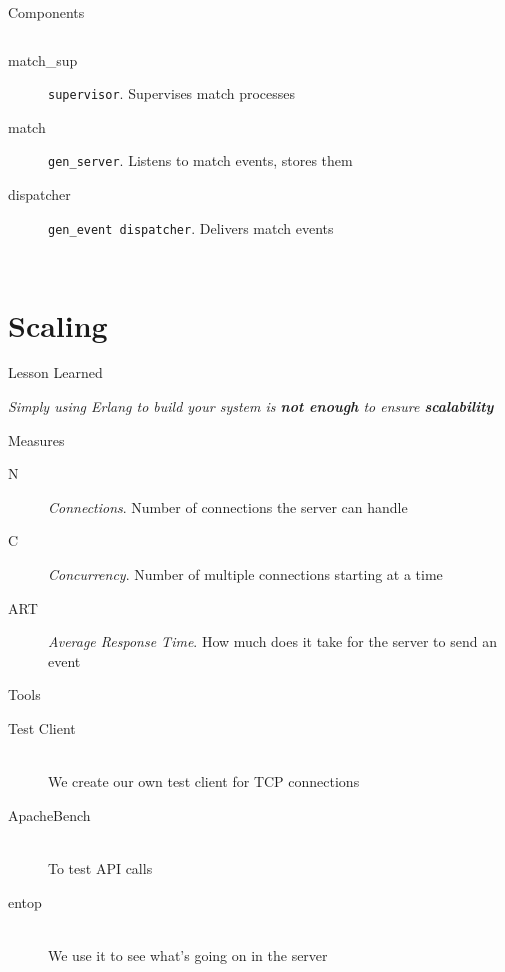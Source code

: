 \documentclass[utf8]{beamer}
\begin{document}
\begin{frame}{Components}
\begin{columns}
{\begin{description}
					\item[match\_sup]
						\texttt{supervisor}. Supervises match processes
					\item[match]
						\texttt{gen\_server}. Listens to match events, stores them
					\item[dispatcher]
						\texttt{gen\_event dispatcher}. Delivers match events
				\end{description}}
	\end{columns}
\end{frame}

\section{Scaling}
\begin{frame}{Lesson Learned}
	\begin{center}
		\huge \emph{Simply using Erlang to build your system is \textbf{not enough} to ensure \textbf{scalability}}
	\end{center}
\end{frame}

\begin{frame}{Measures}
	\begin{description}
		\item[N] \emph{Connections}. Number of connections the server can handle
		\item[C] \emph{Concurrency}. Number of multiple connections starting at a time
		\item[ART] \emph{Average Response Time}. How much does it take for the server to send an event
	\end{description}
\end{frame}
\begin{frame}{Tools}
	\begin{description}
		\item[Test Client]~\\ We create our own test client for TCP connections
		\item[ApacheBench]~\\ To test API calls
		\item[entop]~\\ We use it to see what's going on in the server
	\end{description}
\end{frame}
\end{document}
